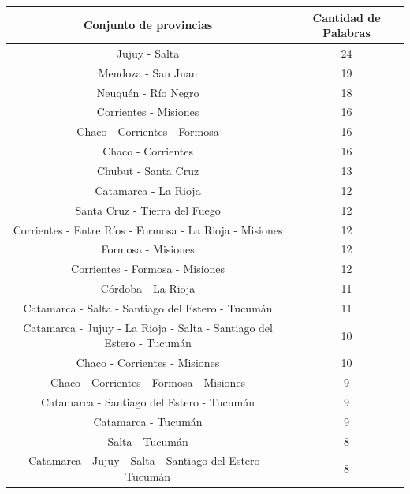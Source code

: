 \begin{table}
\centering
\begin{tabular}{|c|c|}
\hline
Conjunto de provincias                                 & Cantidad de Palabras  \\ \hline
Jujuy - Salta                                          & 24          \\
Mendoza - San Juan                                    & 19          \\
Neuquén - Río Negro                                   & 18          \\
Corrientes - Misiones                                 & 16          \\
Chaco - Corrientes - Formosa                           & 16          \\
Chaco - Corrientes                                    & 16          \\
Chubut - Santa Cruz                                   & 13          \\
Catamarca - La Rioja                                  & 12          \\
Santa Cruz - Tierra del Fuego                         & 12          \\
Corrientes - Entre Ríos - Formosa - La Rioja - Misiones  & 12          \\  %
Formosa - Misiones                                    & 12          \\
Corrientes - Formosa - Misiones                        & 12          \\
Córdoba - La Rioja                                    & 11          \\
Catamarca - Salta - Santiago del Estero - Tucumán       & 11          \\
Catamarca - Jujuy - La Rioja - Salta - Santiago del Estero - Tucumán & 10          \\
Chaco - Corrientes - Misiones                          & 10          \\
Chaco - Corrientes - Formosa - Misiones                 & 9           \\
Catamarca - Santiago del Estero - Tucumán              & 9           \\
Catamarca - Tucumán                                   & 9           \\
Salta - Tucumán                                       & 8           \\
Catamarca - Jujuy - Salta - Santiago del Estero - Tucumán& 8           \\

\end{tabular}
\end{table}
